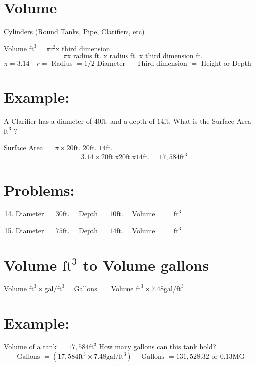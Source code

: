 \begin{enumerate}
\section{Volume}
Cylinders (Round Tanks, Pipe, Clarifiers, etc)

Volume $\mathrm{ft}^{3}=\pi \mathrm{r}^{2} \mathrm{x}$ third dimension
$$
=\pi \mathrm{x} \text { radius } \mathrm{ft} \text {. } \mathrm{x} \text { radius } \mathrm{ft} \text {. } \mathrm{x} \text { third dimension } \mathrm{ft} \text {. }
$$
$\pi=3.14 \quad r=$ Radius $=1 / 2$ Diameter $\quad$ Third dimension $=$ Height or Depth

\section{Example:}
A Clarifier has a diameter of $40 \mathrm{ft}$. and a depth of $14 \mathrm{ft}$. What is the Surface Area $\mathrm{ft}^{3}$ ?

Surface Area $=\pi \times 20 \mathrm{ft}$. $20 \mathrm{ft}$. $14 \mathrm{ft}$.
$$
=3.14 \times 20 \mathrm{ft} . \mathrm{x} 20 \mathrm{ft} . \mathrm{x} 14 \mathrm{ft} .=17,584 \mathrm{ft}^{3}
$$

\section{Problems:}
\begin{enumerate}
  \setcounter{enumi}{13}
  \item Diameter $=30 \mathrm{ft} . \quad$ Depth $=10 \mathrm{ft} . \quad$ Volume $=\quad \mathrm{ft}^{3}$

  \item Diameter $=75 \mathrm{ft} . \quad$ Depth $=14 \mathrm{ft} . \quad$ Volume $=\quad \mathrm{ft}^{3}$

\end{enumerate}
\section{Volume $\mathrm{ft}^{3}$ to Volume gallons}
Volume $\mathrm{ft}^{3} \times \mathrm{gal} / \mathrm{ft}^{3} \quad$ Gallons $=$ Volume $\mathrm{ft}^{3} \times 7.48 \mathrm{gal} / \mathrm{ft}^{3}$

\section{Example:}
Volume of a tank $=17,584 \mathrm{ft}^{3}$ How many gallons can this tank hold?
$$
\text { Gallons }=\left(17,584 \mathrm{ft}^{3} \times 7.48 \mathrm{gal} / \mathrm{ft}^{3}\right) \quad \text { Gallons }=131,528.32 \text { or } 0.13 \mathrm{MG}
$$


\end{enumerate}
